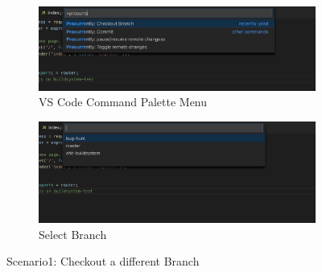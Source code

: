\begin{figure}[h]
    \begin{subfigure}{.5\textwidth}
        \centering
        \includegraphics[width=1\linewidth]{figures/screenshots/scenarios/1checkout_branch.png}
        \caption{VS Code Command Palette Menu}
        \label{fig:1checkout_branch_palette}
    \end{subfigure}
    \begin{subfigure}{.5\textwidth}
        \centering
        \includegraphics[width=1\linewidth]{figures/screenshots/scenarios/1checkout_bughunt.png}
        \caption{Select Branch}
        \label{fig:1checkout_bughunt}
    \end{subfigure}
    \caption{Scenario1: Checkout a different Branch}
\end{figure}


